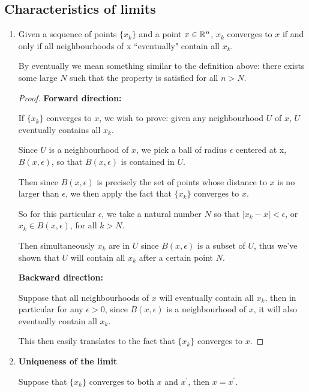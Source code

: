 \subsection{Characteristics of limits}
\begin{enumerate}
\item Given a sequence of points $\{x_k\}$ and a point $x\in\mathbb R^n$, $x_k$ converges to $x$ if and only if all neighbourhoods of x ``eventually" contain all $x_k$.

By eventually we mean something similar to the definition above: there exists some large $N$ such that the property is satisfied for all $n>N$.

\begin{proof}

\textbf{Forward direction:} 

If $\{x_k\}$ converges to $x$, we wish to prove: given any neighbourhood $U$ of $x$, $U$ eventually contains all $x_k$.

Since $U$ is a neighbourhood of $x$, we pick a ball of radius $\epsilon$ centered at x, $B(x,\epsilon)$, so that $B(x,\epsilon)$ is contained in $U$.

Then since $B(x,\epsilon)$ is precisely the set of points whose distance to $x$ is no larger than $\epsilon$, we then apply the fact that $\{x_k\}$ converges to $x$.

So for this particular $\epsilon$, we take a natural number $N$ so that $|x_k-x|<\epsilon$, or $x_k \in B(x,\epsilon)$, for all $k>N$.

Then simultaneously $x_k$ are in $U$ since $B(x,\epsilon)$ is a subset of $U$, thus we've shown that $U$ will contain all $x_k$ after a certain point $N$.

\vspace{.5cm}

\textbf{Backward direction:}

Suppose that all neighbourhoods of $x$ will eventually contain all $x_k$, then in particular for any $\epsilon>0$, since $B(x,\epsilon)$ is a neighbourhood of $x$, it will also eventually contain all $x_k$.

This then easily translates to the fact that $\{x_k\}$ converges to $x$.
\end{proof}

\item \textbf{Uniqueness of the limit}

Suppose that $\{x_k\}$ converges to both $x$ and $x^\prime$, then $x=x^\prime$.


\end{enumerate}
